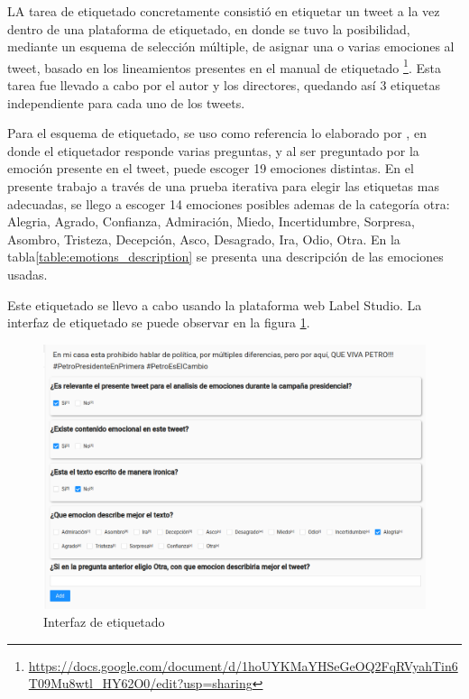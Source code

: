 LA tarea de etiquetado concretamente consistió en etiquetar un tweet a la vez dentro de una plataforma de etiquetado, en donde se tuvo la posibilidad, mediante un esquema de selección múltiple, de asignar una o varias emociones al tweet, basado en los lineamientos presentes en el manual de etiquetado \footnote{\url{https://docs.google.com/document/d/1hoUYKMaYHSeGeOQ2FqRVyahTin6T09Mu8wtl_HY62O0/edit?usp=sharing}}. Esta tarea fue llevado a cabo por el autor y los directores, quedando así 3 etiquetas independiente para cada uno de los tweets.

Para el esquema de etiquetado, se uso como referencia lo elaborado por \cite{mohammad2015sentiment}, en donde el etiquetador responde varias preguntas, y al ser preguntado por la emoción presente en el tweet,  puede escoger 19 emociones distintas. En el presente trabajo a través de una prueba iterativa para elegir las etiquetas mas adecuadas, se llego a escoger 14 emociones posibles ademas de la categoría otra: Alegria, Agrado, Confianza, Admiración, Miedo, Incertidumbre, Sorpresa, Asombro, Tristeza, Decepción, Asco, Desagrado, Ira, Odio, Otra. En la tabla\ref{table:emotions_description} se presenta una descripción de las emociones usadas.




Este etiquetado se llevo a cabo usando la plataforma web Label Studio. La interfaz de etiquetado se puede observar en la figura \ref{figure:interfaz}.


\begin{figure}[t]
	\centering
	\includegraphics[scale=0.45]{Images & Logos/interfaz.png}
	\caption{Interfaz de etiquetado} 
	\label{figure:interfaz}
\end{figure}

